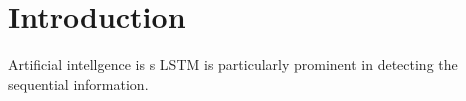 \section{Introduction}
Artificial intellgence is s
LSTM is particularly prominent in detecting the sequential information. 